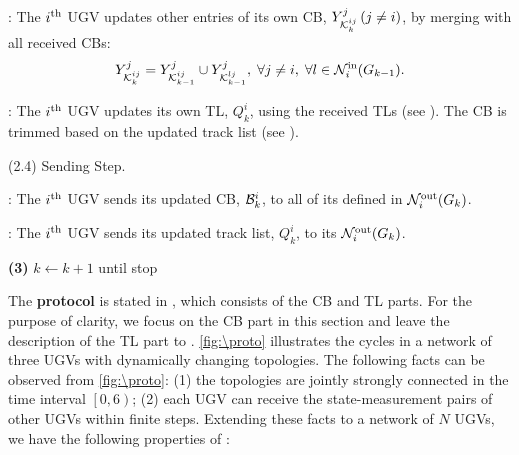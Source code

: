 \begin{algorithm}
\begin{algorithmic}
			\CB: The $i^\text{th}$ UGV updates other entries of its own CB, $Y^j_{\mathcal{K}^{ij}_{k}}\,(j\neq i)$, by merging with all received CBs:						
			\small\begin{equation*}
			Y^j_{\mathcal{K}^{ij}_{k}} = Y^j_{\mathcal{K}^{ij}_{k-1}} \cup Y^j_{\mathcal{K}^{lj}_{k-1}},
			\; \forall j\neq i,\;\forall l\in \mathcal{N}^\text{in}_i(G_{k-1}).
			\end{equation*}\normalsize
			
			\TL: The $i^\text{th}$ UGV updates its own TL, $Q^i_k$, using the received TLs (see ).
			\textcolor{\revcol}{The CB is trimmed based on the updated track list (see )}. 
			
			\State (2.4) Sending Step.
			
			\CB: The $i^\text{th}$ UGV sends its updated CB, \small$\mathcal{B}^i_k$\normalsize, 
			to all of its {\onbhd} defined in $\mathcal{N}^\text{out}_i(G_k)$.
			
			\TL: The $i^\text{th}$ UGV sends its updated track list, $Q^i_k$, to its {\onbhd} $\mathcal{N}^\text{out}_i(G_k)$.
			
			\State \textbf{(3)} $k\leftarrow k+1$ until stop
		\end{algorithmic}
	\end{algorithm}
	
	The \textbf{{\proto} protocol} is stated in ,
	\textcolor{\revcol}{which consists of the CB and TL parts. For the purpose of clarity, we focus on the CB part in this section and leave the description of the TL part to .}
	\cref{fig:\proto} illustrates the {\proto} cycles in a network of three UGVs with dynamically changing topologies.
	The following facts can be observed from \cref{fig:\proto}: 
	(1) the topologies are jointly strongly connected in the time interval $\left[0,6\right)$;
	(2) each UGV can receive the state-measurement pairs of other UGVs within finite steps.
	Extending these facts to a network of $N$ UGVs, we have the following properties of \proto:
	
